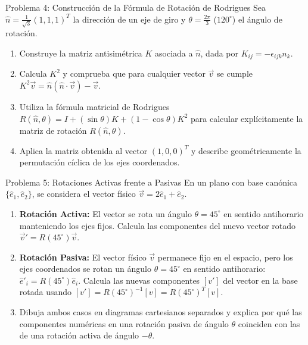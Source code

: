 \documentclass[11pt,letterpaper]{article}
\begin{document}
\begin{infobox}{Problema 4: Construcción de la Fórmula de Rotación de Rodrigues}
Sea $\hat{n} = \frac{1}{\sqrt{3}}(1, 1, 1)^T$ la dirección de un eje de giro y $\theta = \frac{2\pi}{3}$ ($120^\circ$) el ángulo de rotación.
\begin{enumerate}[label=(\alph*)]
    \item Construye la matriz antisimétrica $K$ asociada a $\hat{n}$, dada por $K_{ij} = -\epsilon_{ijk} n_k$.
    \item Calcula $K^2$ y comprueba que para cualquier vector $\vec{v}$ se cumple $K^2 \vec{v} = \hat{n}(\hat{n}\cdot\vec{v}) - \vec{v}$.
    \item Utiliza la fórmula matricial de Rodrigues $R(\hat{n}, \theta) = I + (\sin\theta)K + (1 - \cos\theta)K^2$ para calcular explícitamente la matriz de rotación $R(\hat{n}, \theta)$.
    \item Aplica la matriz obtenida al vector $(1, 0, 0)^T$ y describe geométricamente la permutación cíclica de los ejes coordenados.
\end{enumerate}
\end{infobox}


\begin{infobox}{Problema 5: Rotaciones Activas frente a Pasivas}
En un plano con base canónica $\{\hat{e}_1, \hat{e}_2\}$, se considera el vector físico $\vec{v} = 2\hat{e}_1 + \hat{e}_2$.
\begin{enumerate}[label=(\alph*)]
    \item \textbf{Rotación Activa:} El vector se rota un ángulo $\theta = 45^\circ$ en sentido antihorario manteniendo los ejes fijos. Calcula las componentes del nuevo vector rotado $\vec{v}' = R(45^\circ)\vec{v}$.
    \item \textbf{Rotación Pasiva:} El vector físico $\vec{v}$ permanece fijo en el espacio, pero los ejes coordenados se rotan un ángulo $\theta = 45^\circ$ en sentido antihorario: $\hat{e}'_i = R(45^\circ)\hat{e}_i$.
    Calcula las nuevas componentes $[v']$ del vector en la base rotada usando $[v'] = R(45^\circ)^{-1}[v] = R(45^\circ)^T [v]$.
    \item Dibuja ambos casos en diagramas cartesianos separados y explica por qué las componentes numéricas en una rotación pasiva de ángulo $\theta$ coinciden con las de una rotación activa de ángulo $-\theta$.
\end{enumerate}
\end{infobox}
\end{document}
